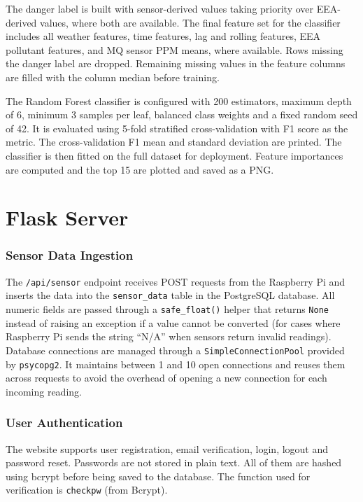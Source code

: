 The danger label is built with sensor-derived values taking priority over EEA-derived values,
where both are available. The final feature set for the classifier includes all weather
features, time features, lag and rolling features, EEA pollutant features, and MQ sensor PPM
means, where available. Rows missing the danger label are dropped. Remaining missing values in
the feature columns are filled with the column median before training.

The Random Forest classifier is configured with 200 estimators, maximum depth of 6, minimum 3
samples per leaf, balanced class weights and a fixed random seed of 42. It is evaluated using
5-fold stratified cross-validation with F1 score as the metric. The cross-validation F1 mean
and standard deviation are printed. The classifier is then fitted on the full dataset for
deployment. Feature importances are computed and the top 15 are plotted and saved as a PNG.


\section{Flask Server}
\label{sec:flask-server}

\subsubsection*{Sensor Data Ingestion}

The \texttt{/api/sensor} endpoint receives POST requests from the Raspberry Pi and inserts the
data into the \texttt{sensor\_data} table in the PostgreSQL database. All numeric fields are
passed through a \texttt{safe\_float()} helper that returns \texttt{None} instead of raising an
exception if a value cannot be converted (for cases where Raspberry Pi sends the string
``N/A'' when sensors return invalid readings). Database connections are managed through a
\texttt{SimpleConnectionPool} provided by \texttt{psycopg2}. It maintains between 1 and 10
open connections and reuses them across requests to avoid the overhead of opening a new
connection for each incoming reading.

\subsubsection*{User Authentication}

The website supports user registration, email verification, login, logout and password reset.
Passwords are not stored in plain text. All of them are hashed using bcrypt before being saved
to the database. The function used for verification is \texttt{checkpw} (from Bcrypt).

